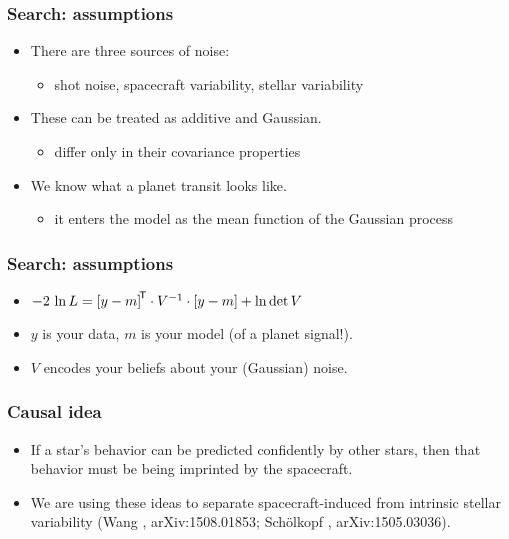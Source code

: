 \documentclass[pdftex]{beamer}
\begin{document}

\begin{frame}
  \frametitle{Search: assumptions}
  \begin{itemize}
  \item There are three sources of noise:
    \begin{itemize}
    \item shot noise, spacecraft variability, stellar variability
    \end{itemize}
  \item These can be treated as additive and Gaussian.
    \begin{itemize}
    \item differ only in their covariance properties
    \end{itemize}
  \item We know what a planet transit looks like.
    \begin{itemize}
    \item it enters the model as the mean function of the Gaussian process
    \end{itemize}
  \end{itemize}
\end{frame}

\begin{frame}
  \frametitle{Search: assumptions}
  \begin{itemize}
  \item $-2\,\ln L = {[y - m]}^{\mathsf{\!T}}\cdot V^{-1}\cdot [y - m] + \ln\det V$
  \item $y$ is your data, $m$ is your model (of a planet signal!).
  \item $V$ encodes your beliefs about your (Gaussian) noise.
  \end{itemize}
\end{frame}

\begin{frame}
  \frametitle{Causal idea}
  \begin{itemize}
  \item If a star's behavior can be predicted confidently by
    other stars, then that behavior must be being imprinted by
    the spacecraft.
  \item We are using these ideas to separate spacecraft-induced from
    intrinsic stellar variability {\footnotesize (Wang \etal, arXiv:1508.01853;
    Sch\"olkopf \etal, arXiv:1505.03036)}.
  \end{itemize}
\end{frame}
\end{document}
